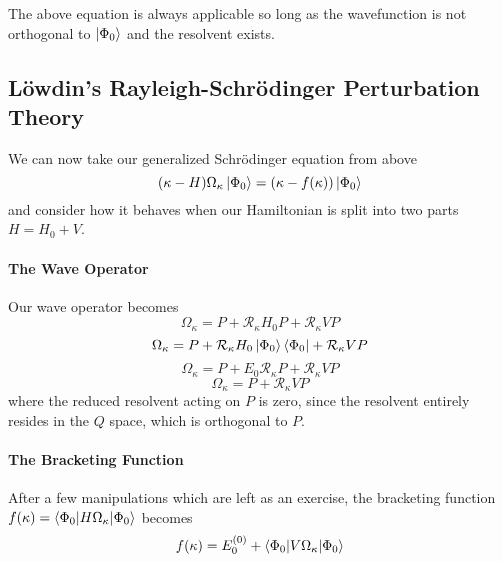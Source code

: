 \documentclass{article}
\newcommand{\Ezero}{E^{(0)}}
\begin{document}
The above equation is always applicable so long as the wavefunction is not orthogonal to $\ket{\Phi_0}$
and the resolvent exists.

%

\subsection{L{\"o}wdin's Rayleigh-Schr{\"o}dinger Perturbation Theory}
We can now take our generalized Schr{\"o}dinger equation from above 
\[ (\kappa - H) \Omega_\kappa \ket{\Phi_0} = (\kappa - f(\kappa)) \ket{\Phi_0} \]
and consider how it behaves when our Hamiltonian is split into two parts $H = H_0 + V$. 

\paragraph{\textbf{The Wave Operator}}
Our wave operator becomes
\[\Omega_\kappa = P + \mathcal{R}_{\kappa} H_0 P + \mathcal{R}_{\kappa} V P \]
\[\Omega_\kappa = P + \mathcal{R}_{\kappa} H_0 \ket{\Phi_0}\bra{\Phi_0} + \mathcal{R}_{\kappa} V P \]
\[\Omega_\kappa = P + E_0 \mathcal{R}_{\kappa} P + \mathcal{R}_{\kappa} V P \]
\[\Omega_\kappa = P + \mathcal{R}_{\kappa} V P \]
where the reduced resolvent acting on $P$ is zero, since the resolvent entirely resides in the $Q$ space, which is orthogonal to $P$.

\paragraph{\textbf{The Bracketing Function}}
After a few manipulations which are left as an exercise, 
the bracketing function $f(\kappa) = \braket{\Phi_0 | H \Omega_\kappa | \Phi_0}$ becomes 
\[f(\kappa) = \Ezero_0 + \braket{\Phi_0 | V \Omega_\kappa | \Phi_0 } \]
\end{document}
